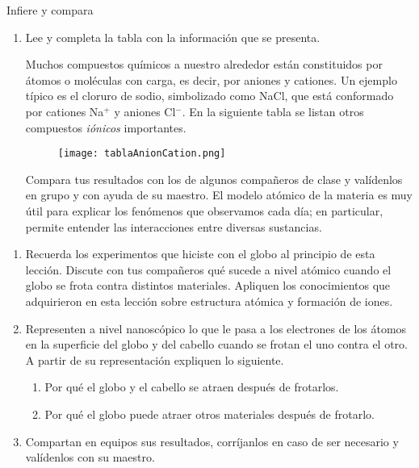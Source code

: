 \begin{boxK}
    Infiere y compara
    \begin{enumerate}
        \item Lee y completa la tabla con la información que se presenta.
              \begin{boxF}
                  Muchos compuestos químicos a nuestro alrededor están constituidos por átomos o moléculas con carga, es decir,
                  por aniones y cationes. Un ejemplo típico es el cloruro de sodio, simbolizado como NaCl, que está conformado por
                  cationes Na$^+$ y aniones Cl$^-$. En la siguiente tabla se listan otros compuestos \emph{iónicos} importantes.
              \end{boxF}

              \begin{figure}[H]
                  \centering
                  \texttt{[image: tablaAnionCation.png]}
                  \label{fig:tablaAnionCation}
              \end{figure}%

              Compara tus resultados con los de algunos compañeros de clase y valídenlos en grupo y con ayuda de su maestro.
              El modelo atómico de la materia es muy útil para explicar los fenómenos que observamos cada día; en particular, permite entender las interacciones entre diversas sustancias.
    \end{enumerate}
\end{boxK}
%
\begin{boxK}
    \begin{enumerate}
        \item Recuerda los experimentos que hiciste con el globo al principio de esta lección. Discute con tus compañeros qué sucede a nivel atómico cuando el globo se frota contra distintos materiales. Apliquen los conocimientos que adquirieron en esta lección sobre estructura atómica y formación de iones.
        \item Representen a nivel nanoscópico lo que le pasa a los electrones de los átomos en la superficie del globo y del cabello cuando se frotan el uno contra el otro. A partir de su representación expliquen lo siguiente.
              \begin{enumerate}
                  \item Por qué el globo y el cabello se atraen después de frotarlos.
                  \item Por qué el globo puede atraer otros materiales después de frotarlo.
              \end{enumerate}
        \item Compartan en equipos sus resultados, corríjanlos en caso de ser necesario y valídenlos con su maestro.
    \end{enumerate}
\end{boxK}

